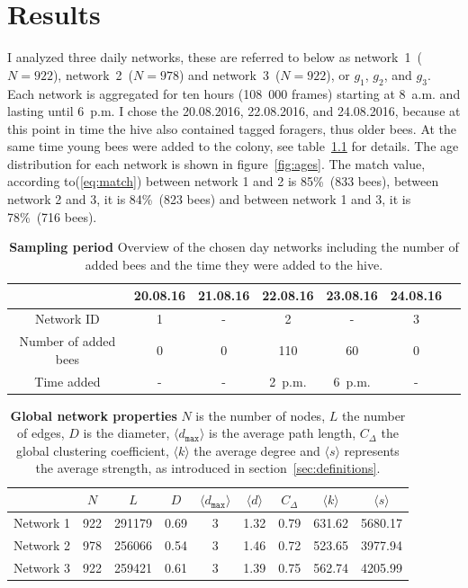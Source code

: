\chapter{Results}

I analyzed three daily networks, these are referred to below as network~1~($N=922$), network~2~($N=978$) and network~3~($N=922$), or $g_1$, $g_2$, and $g_3$. Each network is aggregated for ten hours (108~000 frames) starting at 8~a.m. and lasting until 6~p.m. I chose the 20.08.2016, 22.08.2016, and 24.08.2016, because at this point in time the hive also contained tagged foragers, thus older bees. At the same time young bees were added to the colony, see table~\ref{tab:networks} for details. The age distribution for each network is shown in figure~\ref{fig:ages}. The match value, according to(\ref{eq:match}) between network 1 and 2 is 85\%~(833 bees), between network 2 and 3, it is 84\%~(823 bees) and between network 1 and 3, it is 78\%~(716 bees).

\begin{table}[htb]
\centering
\caption[Sampling period]{\textbf{Sampling period} Overview of the chosen day networks including the number of added bees and the time they were added to the hive.}
\vspace*{5mm}
\begin{tabularx}{\textwidth}{ccccccc}
\toprule
{} & 20.08.16 & 21.08.16 & 22.08.16 & 23.08.16 & 24.08.16 \\
\midrule
Network ID & 1 & - & 2 & - & 3 & \\
Number of added bees & 0 & 0 & 110 & 60 & 0 \\
Time added & - & - & 2~p.m. & 6~p.m. & - \\
\bottomrule
\end{tabularx}
\label{tab:networks}
\end{table}


\begin{table}[htb]
\centering
\caption[Global network properties]{\textbf{Global network properties} $N$ is the number of nodes, $L$ the number of edges, $D$ is the diameter, $\langle d_{\texttt{max}} \rangle$ is the average path length, $C_\Delta$ the global clustering coefficient, $\langle k \rangle$ the average degree and $\langle s \rangle$ represents the average strength, as introduced in section~\ref{sec:definitions}.}
\label{tab:stats}
\vspace*{5mm}
\begin{tabularx}{\textwidth}{lcccccccc}
\toprule
{} &  $N$ &   $L$ &  $D$ &  $\langle d_{\texttt{max}} \rangle$ &  $\langle d \rangle$ &   $C_\Delta$ &  $\langle k \rangle$ &  $\langle s \rangle$ \\
\midrule
Network 1 &    922 &  291179 &     0.69 &         3 &              1.32 &  0.79 &      631.62 &      5680.17 \\
Network 2 &    978 &  256066 &     0.54 &         3 &              1.46 &  0.72 &      523.65 &      3977.94 \\
Network 3 &    922 &  259421 &     0.61 &         3 &              1.39 &  0.75 &      562.74 &      4205.99 \\
\bottomrule
\end{tabularx}
\end{table}

